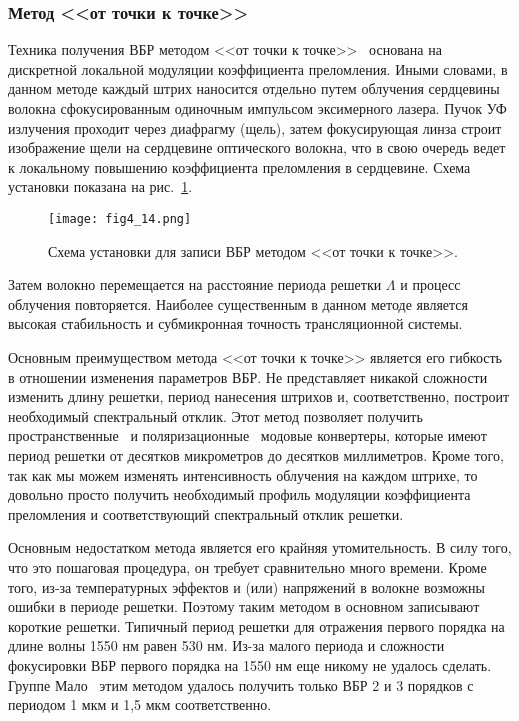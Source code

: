 \subsubsection{Метод <<от точки к точке>>}

Техника получения ВБР методом <<от точки к точке>>~\cite{Malo93} основана на дискретной локальной модуляции коэффициента преломления. Иными словами, в данном методе каждый штрих наносится отдельно путем облучения сердцевины волокна сфокусированным одиночным импульсом эксимерного лазера. Пучок УФ излучения проходит через диафрагму (щель), затем фокусирующая линза строит изображение щели на сердцевине оптического волокна, что в свою очередь ведет к локальному повышению коэффициента преломления в сердцевине. Схема установки показана на рис.~\ref{fig4.14}.

\begin{figure}
\centering
\texttt{[image: fig4\_14.png]}
\caption{Схема установки для записи ВБР методом <<от точки к точке>>.}\label{fig4.14}
\end{figure}

Затем волокно перемещается на расстояние периода решетки $\Lambda$ и процесс облучения повторяется. Наиболее существенным в данном методе является высокая стабильность и субмикронная точность трансляционной системы.

Основным преимуществом метода <<от точки к точке>> является его гибкость в отношении изменения параметров ВБР. Не представляет никакой сложности изменить длину решетки, период нанесения штрихов и, соответственно, построит необходимый спектральный отклик. Этот метод позволяет получить пространственные~\cite{Hill90} и поляризационные~\cite{Hill91} модовые конвертеры, которые имеют период решетки от десятков микрометров до десятков миллиметров. Кроме того, так как мы можем изменять интенсивность облучения на каждом штрихе, то довольно просто получить необходимый профиль модуляции коэффициента преломления и соответствующий спектральный отклик решетки.

Основным недостатком метода является его крайняя утомительность. В силу того, что это пошаговая процедура, он требует сравнительно много времени. Кроме того, из-за температурных эффектов и (или) напряжений в волокне возможны ошибки в периоде решетки. Поэтому таким методом в основном записывают короткие решетки. Типичный период решетки для отражения первого порядка на длине волны 1550 нм равен 530 нм. Из-за малого периода и сложности фокусировки ВБР первого порядка на 1550 нм еще никому не удалось сделать. Группе Мало~\cite{Malo93} этим методом удалось получить только ВБР 2 и 3 порядков с периодом 1 мкм и 1,5 мкм соответственно.

